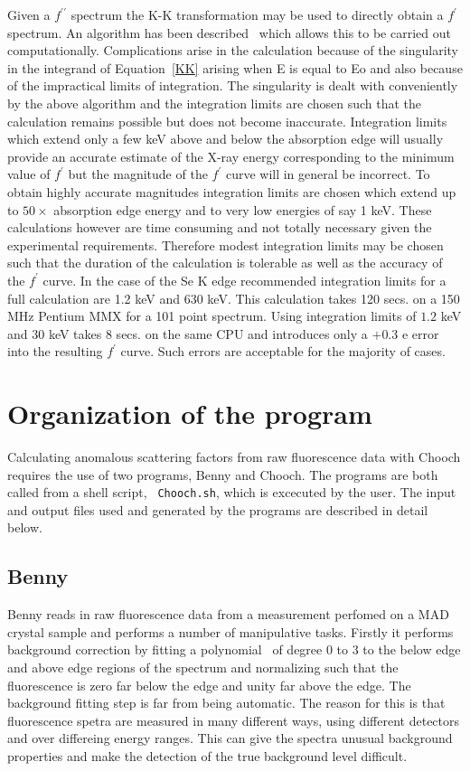 \documentclass[a4]{article}
\begin{document}
Given a $f^{\prime\prime}$
spectrum the K-K transformation may be used to directly obtain a
$f^{\prime}$ spectrum. An algorithm has been
described~\cite{HoytFontaine} which allows this to be carried out
computationally.  Complications arise in the calculation because of
the singularity in the integrand of Equation~\ref{KK} arising when E is equal to Eo and
also because of the impractical limits of integration.  The
singularity is dealt with conveniently by the above algorithm and the
integration limits are chosen such that the calculation remains
possible but does not become inaccurate. Integration limits which
extend only a few keV above and below the absorption edge will usually
provide an accurate estimate of the X-ray energy corresponding to the
minimum value of $f^{\prime}$ but the magnitude of the $f^{\prime}$
curve will in general be incorrect. To obtain highly accurate
magnitudes integration limits are chosen which extend up to $50
\times$ absorption edge energy and to very low energies of say 1
keV. These calculations however are time consuming and not totally
necessary given the experimental requirements. Therefore modest
integration limits may be chosen such that the duration of the
calculation is tolerable as well as the accuracy of the $f^{\prime}$
curve. In the case of the Se K edge recommended integration limits for
a full calculation are 1.2 keV and 630 keV. This calculation takes 120
secs. on a 150 MHz Pentium MMX for a 101 point spectrum. Using
integration limits of $1.2$ keV and $30$ keV takes 8 secs. on the same
CPU and introduces only a $+0.3$ e error into the resulting
$f^{\prime}$ curve.  Such errors are acceptable for the majority of
cases.

\section{Organization of the program}

Calculating anomalous scattering factors from raw fluorescence data
with {\sc Chooch} requires the use of two programs, {\sc Benny} and
{\sc Chooch}. The programs are both called from a shell script, {\tt
Chooch.sh}, which is excecuted by the user. The input and output files
used and generated by the programs are described in detail below.

\subsection{\sc Benny}

{\sc Benny} reads in raw fluorescence data from a measurement perfomed
on a MAD crystal sample and performs a number of manipulative
tasks. Firstly it performs background correction by fitting a
polynomial~\cite{Shampine74} of degree 0 to 3 to the below edge and
above edge regions of the spectrum and normalizing such that the
fluorescence is zero far below the edge and unity far above the edge.
The background fitting step is far from being automatic. The reason
for this is that fluorescence spetra are measured in many different
ways, using different detectors and over differeing energy ranges. This can
give the spectra unusual background properties and make the detection of the
true background level difficult.
\end{document}
